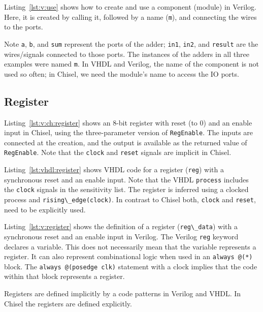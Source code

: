 \documentclass[%
    10pt,
    headinclude, footinclude=false,
    openright, %
    notitlepage,
    cleardoublepage=empty,
    headsepline,
    numbers=noenddot,
    bibliography=totoc, index=totoc,
    ]{scrbook}
\newcommand{\code}[1]{{\lstinline[basicstyle=\small\ttfamily]{#1}}}
\begin{document}
Listing~\ref{lst:v:use} shows how to create and use a component (module)
in Verilog. Here, it is created by calling it, followed by a name (\code{m}),
and connecting the wires to the ports.

Note \code{a}, \code{b}, and \code{sum} represent the ports of the adder;
\code{in1}, \code{in2}, and \code{result} are the wires/signals connected to those ports.
The instances of the adders in all three examples were named \code{m}.
In VHDL and Verilog, the name of the component is not used so often; in Chisel, we need
the module's name to access the IO ports.

\subsection{Register}


Listing~\ref{lst:v:ch:register} shows an 8-bit register with reset (to 0) and an enable input in Chisel,
using the three-parameter version of \code{RegEnable}. The inputs are connected at the creation,
and the output is available as the returned value of \code{RegEnable}.
Note that the \code{clock} and \code{reset} signals are implicit in Chisel.


Listing~\ref{lst:vhdl:register} shows VHDL code for a
register (\code{reg}) with a synchronous reset and an enable input.
Note that the VHDL \code{process} includes the \code{clock}
signals in the sensitivity list. The register is inferred using
a clocked process and \code{rising\_edge(clock)}.
In contrast to Chisel both, \code{clock} and \code{reset}, need to
be explicitly used.




Listing~\ref{lst:v:register} shows the definition of a
register (\code{reg\_data}) with a synchronous reset and an enable input in Verilog.
The Verilog \code{reg} keyword declares a variable. This does not necessarily mean
that the variable represents a register. It can also represent combinational logic
when used in an \code{always @(*)} block.
The \code{always @(posedge clk)} statement with a clock implies that the code within that block
represents a register.

Registers are defined implicitly by a code patterns in Verilog
and VHDL. In Chisel the registers are defined explicitly.
\end{document}
